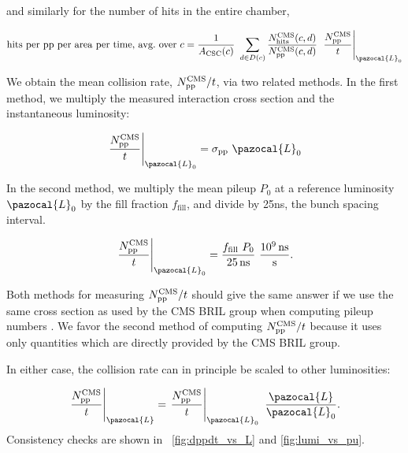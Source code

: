 and similarly for the number of hits in the entire chamber,

\begin{equation}
    \label{eqn:hits_perA_perT_perCSC}
\text{hits per \pp per area per time, avg.\ over $c$} =   
  \frac{1}{A_\text{CSC}(c)}  \  \sum_{d\in D(c)}{\frac{N_\text{hits}^\text{CMS}(c,d)}{N_\text{\pp}^\text{CMS}(c,d)}} \  \left.\frac{N_\text{\pp}^\text{CMS}}{t}\right|_{\pazocal{L}_0}
\end{equation}

We obtain the mean \pp collision rate, $N_\text{\ensuremath{\mathrm{p}}\ensuremath{\mathrm{p}}}^\text{CMS}/t$,
via two related methods. In the first method, we multiply the 
measured \pp interaction cross section and the
instantaneous luminosity:

\begin{equation}
    \label{eqn:sigmaPP_x_lumi}
    \left.\frac{N_\text{\pp}^\text{CMS}}{t}\right|_{\pazocal{L}_0} = \sigma_\text{\pp}  \  \pazocal{L}_0
\end{equation}

In  the second method, we multiply the mean pileup $P_0$ at a reference luminosity $\pazocal{L}_0$ by the fill fraction $f_\text{fill}$, and divide by 25\unit{ns}, the bunch spacing interval. 

\begin{equation}
    \label{eqn:PU_x_ff_over_BS}
	\left.\frac{N_\text{\pp}^\text{CMS}}{t}\right|_{\pazocal{L}_0} = \frac{f_\text{fill}  \  P_0}{25\unit{ns}}  \  \frac{10^9\unit{ns}}{\text{s}}.
\end{equation}

Both methods for measuring $N_\text{\ensuremath{\mathrm{p}}\ensuremath{\mathrm{p}}}^\text{CMS}/t$ should give the same answer if we use the same cross section
as used by the CMS BRIL group when computing pileup numbers \cite{Sirunyan:2018nqx,PileupTwiki}.
We favor the second method of computing $N_\text{\ensuremath{\mathrm{p}}\ensuremath{\mathrm{p}}}^\text{CMS}/t$ because it uses only quantities which are directly provided by the CMS BRIL group. 

In either case, the \pp collision rate can in principle be scaled to other luminosities:

\begin{equation}
    \label{eqn:PU_x_ff_over_BS_scale}
	\left.\frac{N_\text{\pp}^\text{CMS}}{t}\right|_{\pazocal{L}} = 
	\left.\frac{N_\text{\pp}^\text{CMS}}{t}\right|_{\pazocal{L}_0}  \  \frac{\pazocal{L}}{\pazocal{L}_0}.
\end{equation}
Consistency checks are shown in \FigsDot~\ref{fig:dppdt_vs_L} and \ref{fig:lumi_vs_pu}.

